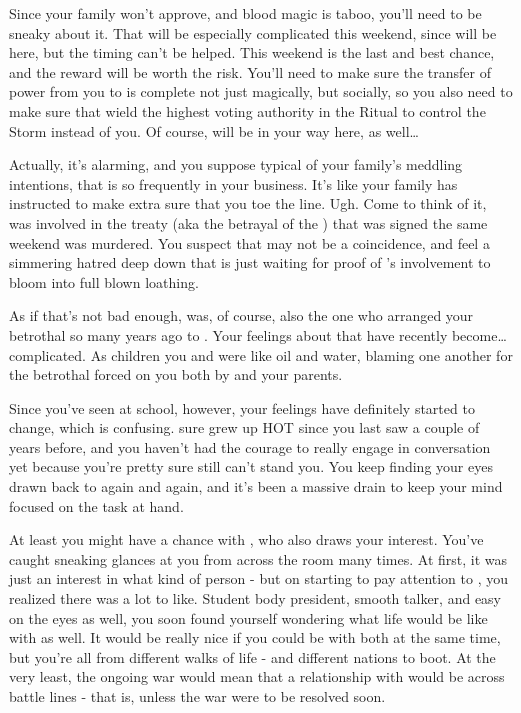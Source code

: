 \documentclass[char]{GL2020}
\begin{document}
Since your family won’t approve, and blood magic is taboo, you’ll need to be sneaky about it.  That will be especially complicated this weekend, since \cDiplomat{} will be here, but the timing can’t be helped.  This weekend is the last and best chance, and the reward will be worth the risk. You’ll need to make sure the transfer of power from you to \cAmbition{} is complete not just magically, but socially, so you also need to make sure that \cAmbition{\they} wield the highest voting authority in the Ritual to control the Storm instead of you. Of course, \cDiplomat{} will be in your way here, as well\ldots 

Actually, it’s alarming, and you suppose typical of your family’s meddling intentions, that \cDiplomat{} is so frequently in your business. It’s like your family has \cDiplomat{\them} instructed to make extra sure that you toe the line. Ugh. Come to think of it, \cDiplomat{} was involved in the treaty (aka the betrayal of the \pShippies{}) that was signed the same weekend \cHeirSibling{} was murdered. You suspect that may not be a coincidence, and feel a simmering hatred deep down that is just waiting for proof of \cDiplomat{}’s involvement to bloom into full blown loathing.

As if that’s not bad enough, \cDiplomat{} was, of course, also the one who arranged your betrothal so many years ago to \cChupStudent{}.  Your feelings about that have recently become\ldots  complicated.  As children you and \cChupStudent{} were like oil and water, blaming one another for the betrothal forced on you both by \cDiplomat{} and your parents.  

Since you’ve seen \cChupStudent{\them} at school, however, your feelings have definitely started to change, which is confusing.  \cChupStudent{} sure grew up HOT since you last saw \cChupStudent{\them} a couple of years before, and you haven’t had the courage to really engage \cChupStudent{\them} in conversation yet because you’re pretty sure \cChupStudent{\they} still can’t stand you. You keep finding your eyes drawn back to \cChupStudent{\them} again and again, and it’s been a massive drain to keep your mind focused on the task at hand.  

At least you might have a chance with \cPresident{}, who also draws your interest. You’ve caught \cPresident{} sneaking glances at you from across the room many times. At first, it was just an interest in what kind of person \cPresident{\they} \cPresident{\were} - but on starting to pay attention to \cPresident{\them}, you realized there was a lot to like. Student body president, smooth talker, and easy on the eyes as well, you soon found yourself wondering what life would be like with \cPresident{} as well. It would be really nice if you could be with both at the same time, but you’re all from different walks of life - and different nations to boot. At the very least, the ongoing war would mean that a relationship with \cPresident{} would be across battle lines - that is, unless the war were to be resolved soon.
\end{document}

